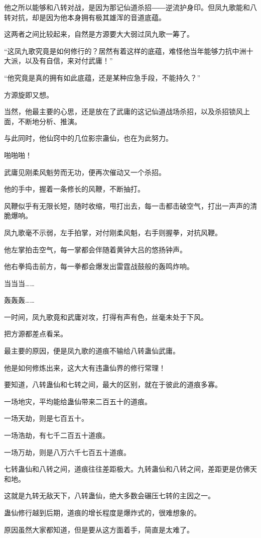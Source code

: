 \begin{this_body}
他之所以能够和八转对战，是因为那记仙道杀招――逆流护身印。但凤九歌能和八转对抗，却是因为他本身拥有极其雄浑的音道底蕴。

这两者之间比较起来，自然是方源要大大弱过凤九歌一筹了。

“这凤九歌究竟是如何修行的？居然有着这样的底蕴，难怪他当年能够力抗中洲十大派，以及有自信，来对付武庸！”

“他究竟是真的拥有如此底蕴，还是某种应急手段，不能持久？”

方源旋即又想。

当然，他最主要的心思，还是放在了武庸的这记仙道战场杀招，以及杀招锁风上面，不断地分析、推演。

与此同时，他仙窍中的几位影宗蛊仙，也在为此努力。

啪啪啪！

武庸见刚柔风魁劳而无功，便再次催动又一个杀招。

他的手中，握着一条修长的风鞭，不断抽打。

风鞭似乎有无限长短，随时收缩，甩打出去，每一击都击破空气，打出一声声的清脆爆响。

凤九歌毫不示弱，左手拍掌，对付刚柔风魁，右手则握拳，对抗风鞭。

他左掌拍击空气，每一掌都会伴随着黄钟大吕的悠扬钟声。

他右拳捣击前方，每一拳都会爆发出雷霆战鼓般的轰鸣炸响。

当当当……

轰轰轰……

一时间，凤九歌竟和武庸对攻，打得有声有色，丝毫未处于下风。

把方源都差点看呆。

最主要的原因，便是凤九歌的道痕不输给八转蛊仙武庸。

他是如何修炼出来，这大大有违蛊仙界的修行常理！

要知道，八转蛊仙和七转之间，最大的区别，就在于彼此的道痕多寡。

一场地灾，平均能给蛊仙带来二百五十的道痕。

一场天劫，则是七百五十。

一场浩劫，有七千二百五十道痕。

一场万劫，则是八万六千七百五十道痕。

七转蛊仙和八转之间，道痕往往差距极大。九转蛊仙和八转之间，差距更是仿佛天和地。

这就是九转无敌天下，八转蛊仙，绝大多数会碾压七转的主因之一。

蛊仙修行越到后期，道痕的增长程度是爆炸式的，很难想象的。

原因虽然大家都知道，但是要从这方面着手，简直是太难了。


\end{this_body}
